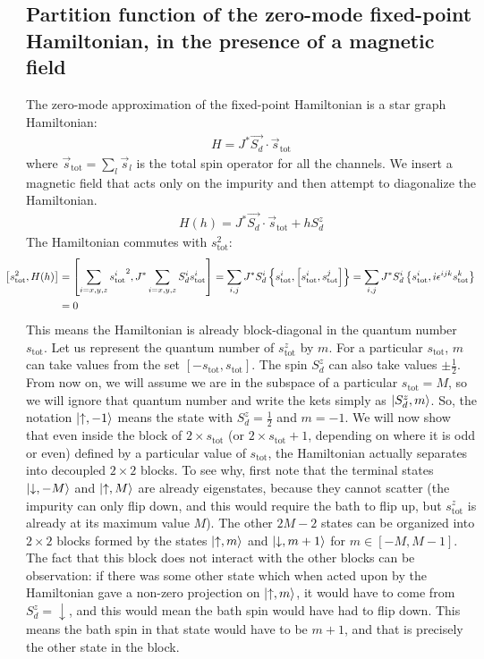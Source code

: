 \documentclass[12pt]{iopart}
\begin{document}
\subsection{Partition function of the zero-mode fixed-point Hamiltonian, in the presence of a magnetic field}
The zero-mode approximation of the fixed-point Hamiltonian is a star graph Hamiltonian:
\begin{eqnarray}
	H = J^* \vec{S_d}\cdot\vec{s}_\text{tot}
\end{eqnarray}
where \(\vec s_\text{tot} = \sum_l \vec s_l\) is the total spin operator for all the channels. We insert a magnetic field that acts only on the impurity and then attempt to diagonalize the Hamiltonian.
\begin{eqnarray}
	\label{stargraph_field_hamiltonian}
	H(h) = J^* \vec{S_d}\cdot\vec{s}_\text{tot} + h S_d^z
\end{eqnarray}
The Hamiltonian commutes with \(s_\text{tot}^2\):
\begin{eqnarray}
	\hspace*{-20pt}\left[s_\text{tot}^2, H(h)\right] &= \left[\sum_{i=x,y,z}{s^i_\text{tot}}^2, J^* \sum_{i=x,y,z} S_d^i s^i_\text{tot}\right] = \sum_{i,j}J^* S_d^i \left\{s_\text{tot}^i, \left[s_\text{tot}^i,s_\text{tot}^j\right]\right\} = \sum_{i,j}J^* S_d^i \left\{s_\text{tot}^i, i \epsilon^{ijk}s^k_\text{tot}\right\}\nonumber\\
							 &= 0
\end{eqnarray}
This means the Hamiltonian is already block-diagonal in the quantum number \(s_\text{tot}\). Let us represent the quantum number of \(s_\text{tot}^z\) by \(m\). For a particular \(s_\text{tot}\), \(m\) can take values from the set \(\left[-s_\text{tot}, s_\text{tot}\right] \). The spin \(S_d^z\) can also take values \(\pm \frac{1}{2}\). From now on, we will assume we are in the subspace of a particular \(s_\text{tot} = M\), so we will ignore that quantum number and write the kets simply as \(\ket{S_d^z, m}\). So, the notation \(\ket{\uparrow,-1}\) means the state with \(S_d^z = \frac{1}{2}\) and \(m = -1\). We will now show that even inside the block of \(2\times s_\text{tot}\) (or \(2\times s_\text{tot} + 1\), depending on where it is odd or even) defined by a particular value of \(s_\text{tot}\), the Hamiltonian actually separates into decoupled \(2\times 2\) blocks. To see why, first note that the terminal states \(\ket{\downarrow, -M}\) and \(\ket{\uparrow, M}\) are already eigenstates, because they cannot scatter (the impurity can only flip down, and this would require the bath to flip up, but \(s^z_\text{tot}\) is already at its maximum value \(M\)). The other \(2M - 2\) states can be organized into \(2\times 2\) blocks formed by the states \(\ket{\uparrow, m}\) and \(\ket{\downarrow, m+1}\) for \(m \in \left[-M, M-1\right] \). The fact that this block does not interact with the other blocks can be observation: if there was some other state which when acted upon by the Hamiltonian gave a non-zero projection on \(\ket{\uparrow, m}\), it would have to come from \(S_d^z = \downarrow\), and this would mean the bath spin would have had to flip down. This means the bath spin in that state would have to be \(m+1\), and that is precisely the other state in the block. 
\end{document}
